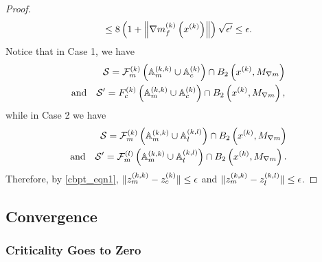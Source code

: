 \begin{proof}
\begin{align*}
\le 8\left(1 + \left\|{\nabla m_f^{(k)}\left(x^{(k)}\right)}\right\|\right) \sqrt{\epsilon'} 
\le \epsilon.
\end{align*}
Notice that in Case 1, we have 
\begin{align*}
\mathcal S  = {\mathcal F_m^{(k)}}\left({\mathbb A_m^{(k, k)}} \cup {\mathbb A_c^{(k)}} \right) \cap B_2\left(x^{(k)}, {M_{\nabla m}}\right) \\ 
\textrm{and} \quad \mathcal S' = {F_c^{(k)}}\left({\mathbb A_m^{(k, k)}} \cup {\mathbb A_c^{(k)}} \right) \cap B_2\left(x^{(k)}, {M_{\nabla m}}\right), 
\end{align*}
while in Case 2 we have 
\begin{align*}
\mathcal S  = {\mathcal F_m^{(k)}}\left({\mathbb A_m^{(k, k)}} \cup {\mathbb A_l^{(k, l)}}\right) \cap B_2\left(x^{(k)}, {M_{\nabla m}}\right) \\
\textrm{and} \quad \mathcal S' = {\mathcal F_m^{(l)}}\left({\mathbb A_m^{(k, k)}} \cup {\mathbb A_l^{(k, l)}} \right) \cap B_2\left(x^{(k)}, {M_{\nabla m}}\right).
\end{align*}
Therefore, by \cref{cbpt_eqn1}, $\|{z_m^{(k, k)}} - {z_c^{(k)}}\| \le \epsilon$ and $\|{z_m^{(k, k)}} - {z_l^{(k, l)}}\| \le \epsilon$.
\end{proof}


\subsection{Convergence}
\label{convergence_section}

\subsubsection{Criticality Goes to Zero}
\label{limit_of_criticallity_to_zero}




